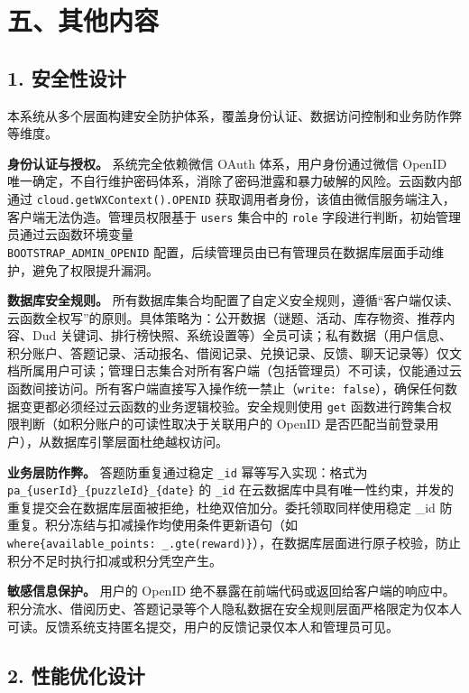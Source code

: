 \documentclass[a4paper,12pt]{article}
\begin{document}
\section{五、其他内容}

\subsection{1. 安全性设计}

本系统从多个层面构建安全防护体系，覆盖身份认证、数据访问控制和业务防作弊等维度。

\textbf{身份认证与授权。} 系统完全依赖微信 OAuth 体系，用户身份通过微信 OpenID 唯一确定，不自行维护密码体系，消除了密码泄露和暴力破解的风险。云函数内部通过 \texttt{cloud.\allowbreak getWXContext().\allowbreak OPENID} 获取调用者身份，该值由微信服务端注入，客户端无法伪造。管理员权限基于 \texttt{users} 集合中的 \texttt{role} 字段进行判断，初始管理员通过云函数环境变量\\\texttt{BOOTSTRAP\_ADMIN\_OPENID} 配置，后续管理员由已有管理员在数据库层面手动维护，避免了权限提升漏洞。

\textbf{数据库安全规则。} 所有数据库集合均配置了自定义安全规则，遵循“客户端仅读、云函数全权写”的原则。具体策略为：公开数据（谜题、活动、库存物资、推荐内容、Dud 关键词、排行榜快照、系统设置等）全员可读；私有数据（用户信息、积分账户、答题记录、活动报名、借阅记录、兑换记录、反馈、聊天记录等）仅文档所属用户可读；管理日志集合对所有客户端（包括管理员）不可读，仅能通过云函数间接访问。所有客户端直接写入操作统一禁止（\texttt{write: false}），确保任何数据变更都必须经过云函数的业务逻辑校验。安全规则使用 \texttt{get} 函数进行跨集合权限判断（如积分账户的可读性取决于关联用户的 OpenID 是否匹配当前登录用户），从数据库引擎层面杜绝越权访问。

\textbf{业务层防作弊。} 答题防重复通过稳定 \texttt{\_id} 幂等写入实现：格式为\\
\texttt{pa\_\{userId\}\_\{puzzleId\}\_\{date\}} 的 \texttt{\_id} 在云数据库中具有唯一性约束，并发的重复提交会在数据库层面被拒绝，杜绝双倍加分。委托领取同样使用稳定 \_id 防重复。积分冻结与扣减操作均使用条件更新语句（如 \texttt{where\{available\_points:\allowbreak\ \_.gte(reward)\}}），在数据库层面进行原子校验，防止积分不足时执行扣减或积分凭空产生。

\textbf{敏感信息保护。} 用户的 OpenID 绝不暴露在前端代码或返回给客户端的响应中。积分流水、借阅历史、答题记录等个人隐私数据在安全规则层面严格限定为仅本人可读。反馈系统支持匿名提交，用户的反馈记录仅本人和管理员可见。

\subsection{2. 性能优化设计}
\end{document}
